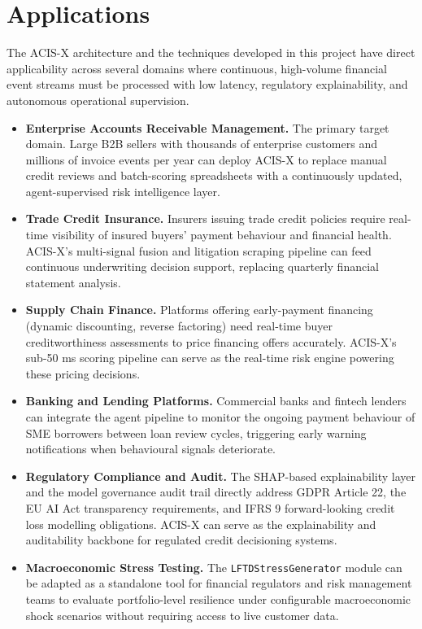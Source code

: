 \documentclass[a4paper, 12pt]{report}
\begin{document}
\section{Applications}
The ACIS-X architecture and the techniques developed in this project have direct applicability across several domains where continuous, high-volume financial event streams must be processed with low latency, regulatory explainability, and autonomous operational supervision.

\begin{itemize}[itemsep=4pt]
    \item \textbf{Enterprise Accounts Receivable Management.} The primary target domain. Large B2B sellers with thousands of enterprise customers and millions of invoice events per year can deploy ACIS-X to replace manual credit reviews and batch-scoring spreadsheets with a continuously updated, agent-supervised risk intelligence layer.

    \item \textbf{Trade Credit Insurance.} Insurers issuing trade credit policies require real-time visibility of insured buyers' payment behaviour and financial health. ACIS-X's multi-signal fusion and litigation scraping pipeline can feed continuous underwriting decision support, replacing quarterly financial statement analysis.

    \item \textbf{Supply Chain Finance.} Platforms offering early-payment financing (dynamic discounting, reverse factoring) need real-time buyer creditworthiness assessments to price financing offers accurately. ACIS-X's sub-50 ms scoring pipeline can serve as the real-time risk engine powering these pricing decisions.

    \item \textbf{Banking and Lending Platforms.} Commercial banks and fintech lenders can integrate the agent pipeline to monitor the ongoing payment behaviour of SME borrowers between loan review cycles, triggering early warning notifications when behavioural signals deteriorate.

    \item \textbf{Regulatory Compliance and Audit.} The SHAP-based explainability layer and the model governance audit trail directly address GDPR Article 22, the EU AI Act transparency requirements, and IFRS 9 forward-looking credit loss modelling obligations. ACIS-X can serve as the explainability and auditability backbone for regulated credit decisioning systems.

    \item \textbf{Macroeconomic Stress Testing.} The \texttt{LFTDStressGenerator} module can be adapted as a standalone tool for financial regulators and risk management teams to evaluate portfolio-level resilience under configurable macroeconomic shock scenarios without requiring access to live customer data.
\end{itemize}
\end{document}
